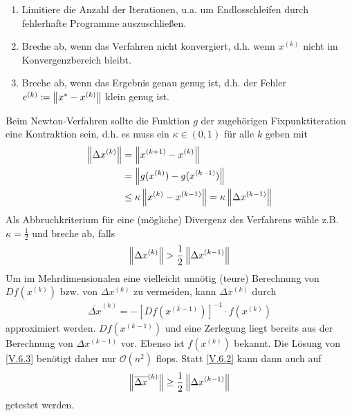 \begin{enumerate}[1)]
\item Limitiere die Anzahl der Iterationen, u.a. um 
  Endlosschleifen durch fehlerhafte Programme auszuschließen.
\item Breche ab, wenn das Verfahren nicht konvergiert, d.h.
  wenn $x^{(k)}$ nicht im Konvergenzbereich bleibt.
\item Breche ab, wenn das Ergebnis genau genug ist, d.h. der
  Fehler $e^{(k)}\coloneqq \left\| x^{*}-x^{(k)} \right\|$ klein genug ist.
\end{enumerate}


Beim Newton-Verfahren sollte die Funktion $g$ der zugehörigen
Fixpunktiteration eine Kontraktion sein, d.h. es muss ein 
$\kappa \in (0,1)$ für alle $k$ geben mit
\begin{align}\nonumber
  \left\| \Delta x^{(k)} \right\|&=\left\| x^{(k+1)}-x^{(k)} \right\| \\ \nonumber
                     &= \left\| g(x^{(k)})-g(x^{(k-1)}) \right\|\\
                     &\leq \kappa\left\| x^{(k)}-x^{(k-1)} \right\| = \kappa \left\| \Delta x^{(k-1)} \right\|
                       \label{V.6.1}
\end{align}
Als Abbruchkriterium für eine (mögliche) Divergenz des Verfahrens wähle z.B.
$\kappa=\frac{1}{2}$ und breche ab, falls 
\begin{gather}
  \nn{\Delta x^{(k)}}>\frac{1}{2}\nn{\Delta x^{(k-1)}}
  \label{V.6.2}
\end{gather}
Um im Mehrdimensionalen eine vielleicht unnötig (teure) Berechnung
von $Df(x^{(k)})$ bzw. von $\Delta x^{(k)}$ zu vermeiden, kann 
$\Delta x^{(k)}$ durch 
\begin{gather}
  \overline{\Delta x}^{(k)} = -[Df(x^{(k-1)})]^{-1}\cdot f(x^{(k)})
  \label{V.6.3}
\end{gather}
approximiert werden.
$Df(x^{(k-1)})$ und eine Zerlegung liegt bereits aus der Berechnung von $\Delta x^{(k-1)}$ vor.
Ebenso ist $f(x^{(k)})$ bekannt.
Die Lösung von \eqref{V.6.3} benötigt daher nur $\mathcal{O}(n^2)$ flops.
Statt \eqref{V.6.2} kann dann auch auf 
\begin{gather}
  \left\| \overline{\Delta x}^{(k)} \right\| \geq \frac{1}{2} \left\| \Delta x^{(k-1)} \right\|
  \label{V.6.4}
\end{gather}
getestet werden.


